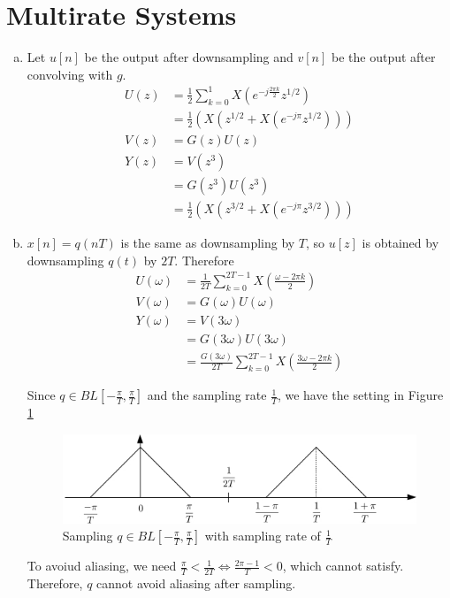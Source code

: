 \section{Multirate Systems}\label{sec:p3}

\begin{enumerate}[(a)]
\item Let $u[n]$ be the output after downsampling and $v[n]$ be the output after convolving with $g$.
\begin{align*}
	U(z) &= \frac{1}{2} \sum_{k=0}^{1}X\left(e^{-j\frac{2\pi k}{2}} z^{1/2}\right)\\
	&= \frac{1}{2} \left(X(z^{1/2} + X(e^{-j\pi}z^{1/2}))\right) \\
	V(z) &= G(z)U(z) \\
	Y(z) &= V(z^3) \\
	&= G(z^3)U(z^3) \\
	&= \frac{1}{2} \left(X(z^{3/2} + X(e^{-j\pi}z^{3/2}))\right)
\end{align*}

\item $x[n] = q(nT)$ is the same as downsampling by $T$, so $u[z]$ is obtained by downsampling $q(t)$ by $2T$. Therefore
\begin{align*}
	U(\omega) &= \frac{1}{2T} \sum_{k=0}^{2T-1} X\left(\frac{\omega-2\pi k}{2}\right) \\
	V(\omega) &= G(\omega)U(\omega) \\
	Y(\omega) &= V(3\omega) \\
	&= G(3\omega)U(3\omega) \\
	&= \frac{G(3\omega)}{2T} \sum_{k=0}^{2T-1} X\left(\frac{3\omega-2\pi k}{2}\right)
\end{align*}

Since $q \in BL[-\frac{\pi}{T}, \frac{\pi}{T}]$ and the sampling rate $\frac{1}{T}$, we have the setting in Figure \ref{fig:p3}
\begin{figure}[htbp]
	\centering
	\includegraphics[width=\textwidth]{images/p3}
	\caption{Sampling $q \in BL[-\frac{\pi}{T}, \frac{\pi}{T}]$ with sampling rate of $\frac{1}{T}$}
	\label{fig:p3}
\end{figure}
To avoiud aliasing, we need $\frac{\pi}{T} < \frac{1}{2T} \Leftrightarrow \frac{2\pi-1}{T} < 0$, which cannot satisfy. Therefore, $q$ cannot avoid aliasing after sampling.
\end{enumerate}